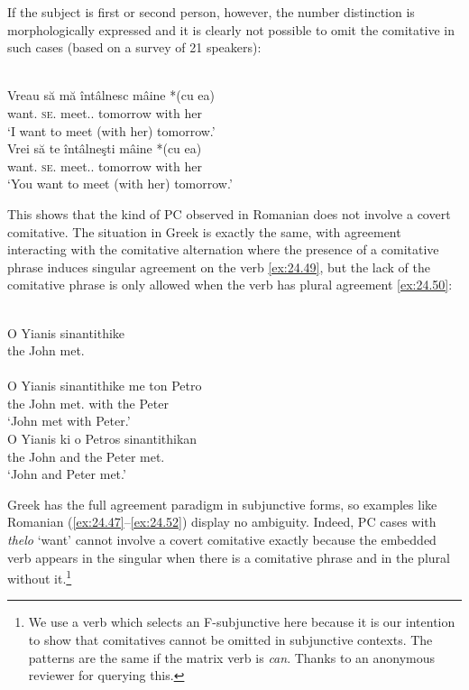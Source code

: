 \documentclass[output=paper]{langsci/langscibook}
\begin{document}
If the subject is first or second person, however, the number distinction is
morphologically expressed and it is clearly not possible to omit the comitative
in such cases (based on a survey of 21 speakers):

\ea%
    \label{ex:24.49}\\
	\gll Vreau   să   mă     întâlnesc    mâine     *(cu ea)\\
		want.\Fsg{}  \Sbjv{}  \textsc{se}.\Fsg{}  meet.\Sbjv{}.\Fsg{}  tomorrow \hphantom{*(}with her\\
	\glt ‘I want to meet (with her) tomorrow.'
\ex%
    \label{ex:24.50}\\
	\gll Vrei   să   te     întâlneşti     mâine     *(cu ea)\\
		want.\Ssg{}  \Sbjv{}  \textsc{se}.\Ssg{}  meet.\Sbjv{}.\Ssg{}  tomorrow \hphantom{*(}with her\\
	\glt ‘You want to meet (with her) tomorrow.'
\z

This shows that the kind of \gls{PC} observed in
Romanian does not involve a covert comitative. The situation in Greek is
exactly the same, with agreement interacting with the comitative alternation
where the presence of a comitative phrase induces singular agreement on the
verb \eqref{ex:24.49}, but the lack of the comitative phrase is only allowed when the verb
has plural agreement \eqref{ex:24.50}:

\ea%
    \label{ex:24.51}\\
	\gll \llap{*}O Yianis sinantithike\\
		the John  met.\Tsg{}\\
    \glt
\ex%
    \label{ex:24.52}\\
	\gll O Yianis sinantithike me ton Petro\\
		the John met.\Tsg{}    with the Peter\\
	\glt ‘John met with Peter.’
\ex%
    \label{ex:24.53}\\
	\gll O Yianis ki o Petros sinantithikan\\
		the John and the Peter met.\Tpl{} \\
	\glt ‘John and Peter met.’
\z

Greek has the full agreement paradigm in subjunctive forms, so examples like
Romanian (\ref{ex:24.47}--\ref{ex:24.52}) display no ambiguity.
Indeed, \gls{PC} cases with \emph{thelo} ‘want’
cannot involve a covert comitative exactly because the embedded verb appears in
the singular when there is a comitative phrase and in the plural without
it.\footnote{We use a verb which selects an F-subjunctive here because it is
    our intention to show that comitatives cannot be omitted in subjunctive
    contexts. The patterns are the same if the matrix verb is \emph{can}. Thanks to an
anonymous reviewer for querying this.}
\end{document}
